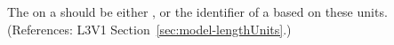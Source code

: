 The  on a \Model should be either ,
 or the identifier of a \UnitDefinition based
on these units.  (References: 
L3V1 Section~\ref{sec:model-lengthUnits}.)
